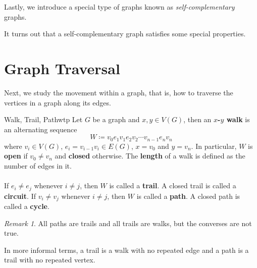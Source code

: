 \documentclass[math]{amznotes}
\makeatletter
\let\save@mathaccent\mathaccent
\newcommand*\if@single[3]{%
  \setbox0\hbox{${\mathaccent"0362{#1}}^H$}%
  \setbox2\hbox{${\mathaccent"0362{\kern0pt#1}}^H$}%
  \ifdim\ht0=\ht2 #3\else #2\fi
  }
\newcommand*\rel@kern[1]{\kern#1\dimexpr\macc@kerna}
\newcommand*\widebar[1]{\@ifnextchar^{{\wide@bar{#1}{0}}}{\wide@bar{#1}{1}}}
\newcommand*\wide@bar[2]{\if@single{#1}{\wide@bar@{#1}{#2}{1}}{\wide@bar@{#1}{#2}{2}}}
\newcommand*\wide@bar@[3]{%
  \begingroup
  \def\mathaccent##1##2{%
    \let\mathaccent\save@mathaccent
    \if#32 \let\macc@nucleus\first@char \fi
    \setbox\z@\hbox{$\macc@style{\macc@nucleus}_{}$}%
    \setbox\tw@\hbox{$\macc@style{\macc@nucleus}{}_{}$}%
    \dimen@\wd\tw@
    \advance\dimen@-\wd\z@
    \divide\dimen@ 3
    \@tempdima\wd\tw@
    \advance\@tempdima-\scriptspace
    \divide\@tempdima 10
    \advance\dimen@-\@tempdima
    \ifdim\dimen@>\z@ \dimen@0pt\fi
    \rel@kern{0.6}\kern-\dimen@
    \if#31
      \overline{\rel@kern{-0.6}\kern\dimen@\macc@nucleus\rel@kern{0.4}\kern\dimen@}%
      \advance\dimen@0.4\dimexpr\macc@kerna
      \let\final@kern#2%
      \ifdim\dimen@<\z@ \let\final@kern1\fi
      \if\final@kern1 \kern-\dimen@\fi
    \else
      \overline{\rel@kern{-0.6}\kern\dimen@#1}%
    \fi
  }%
  \macc@depth\@ne
  \let\math@bgroup\@empty \let\math@egroup\macc@set@skewchar
  \mathsurround\z@ \frozen@everymath{\mathgroup\macc@group\relax}%
  \macc@set@skewchar\relax
  \let\mathaccentV\macc@nested@a
  \if#31
    \macc@nested@a\relax111{#1}%
  \else
    \def\gobble@till@marker##1\endmarker{}%
    \futurelet\first@char\gobble@till@marker#1\endmarker
    \ifcat\noexpand\first@char A\else
      \def\first@char{}%
    \fi
    \macc@nested@a\relax111{\first@char}%
  \fi
  \endgroup
}
\theoremstyle{remark}
\newtheorem*{remark}{Remark}
\newcommand{\0}{\mathbf{0}}
\newcommand{\1}{\mathbf{1}}
\makeatother
\begin{document}
Lastly, we introduce a special type of graphs known as \textit{self-complementary} graphs.
It turns out that a self-complementary graph satisfies some special properties.
\section{Graph Traversal}
Next, we study the movement within a graph, that is, how to traverse the vertices in a graph along its edges.
\begin{dfnbox}{Walk, Trail, Path}{wtp}
    Let $G$ be a graph and $x, y \in V(G)$, then an {\color{red} \textbf{$x$-$y$ walk}} is an alternating sequence
    \begin{equation*}
        W \coloneqq v_0e_1v_1e_2v_2\cdots v_{n - 1}e_nv_n
    \end{equation*}
    where $v_i \in V(G)$, $e_i = v_{i - 1}v_i \in E(G)$, $x = v_0$ and $y = v_n$. In particular, $W$ is {\color{red} \textbf{open}} if $v_0 \neq v_n$ and {\color{red} \textbf{closed}} otherwise. The {\color{red} \textbf{length}} of a walk is defined as the number of edges in it.
    \\\\
    If $e_i \neq e_j$ whenever $i \neq j$, then $W$ is called a {\color{red} \textbf{trail}}. A closed trail is called a {\color{red} \textbf{circuit}}. If $v_i \neq v_j$ whenever $i \neq j$, then $W$ is called a {\color{red} \textbf{path}}. A closed path is called a {\color{red} \textbf{cycle}}.
\end{dfnbox}
\begin{notebox}
    \begin{remark}
        All paths are trails and all trails are walks, but the converses are not true.
    \end{remark}
\end{notebox}
In more informal terms, a trail is a walk with no repeated edge and a path is a trail with no repeated vertex.
\end{document}
